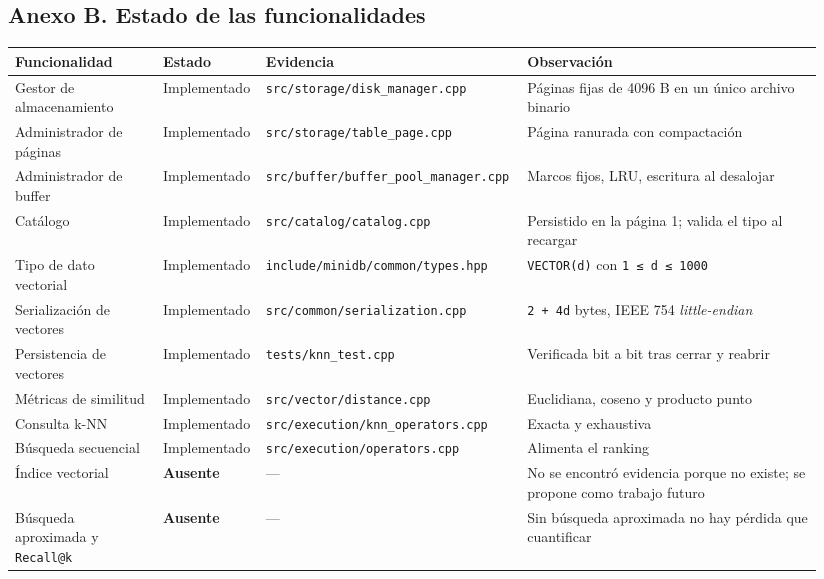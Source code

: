 \documentclass[11pt,a4paper]{article}
\let\subsection\section
\begin{document}
\begin{landscape}
\subsection{Anexo B. Estado de las
funcionalidades}\label{anexo-b-estado-de-las-funcionalidades}

\begin{longtable}[]{@{}L{0.18\linewidth}L{0.12\linewidth}L{0.28\linewidth}L{0.36\linewidth}@{}}
\toprule\noalign{}
Funcionalidad & Estado & Evidencia & Observación \\
\midrule\noalign{}
\endhead
\bottomrule\noalign{}
\endlastfoot
Gestor de almacenamiento & Implementado &
\texttt{src/storage/disk\_manager.cpp} & Páginas fijas de 4096 B en un
único archivo binario \\
Administrador de páginas & Implementado &
\texttt{src/storage/table\_page.cpp} & Página ranurada con
compactación \\
Administrador de buffer & Implementado &
\texttt{src/buffer/buffer\_pool\_manager.cpp} & Marcos fijos, LRU,
escritura al desalojar \\
Catálogo & Implementado & \texttt{src/catalog/catalog.cpp} & Persistido
en la página 1; valida el tipo al recargar \\
Tipo de dato vectorial & Implementado &
\texttt{include/minidb/common/types.hpp} & \texttt{VECTOR(d)} con
\texttt{1\ ≤\ d\ ≤\ 1000} \\
Serialización de vectores & Implementado &
\texttt{src/common/serialization.cpp} & \texttt{2\ +\ 4d} bytes, IEEE
754 \emph{little-endian} \\
Persistencia de vectores & Implementado & \texttt{tests/knn\_test.cpp} &
Verificada bit a bit tras cerrar y reabrir \\
Métricas de similitud & Implementado & \texttt{src/vector/distance.cpp}
& Euclidiana, coseno y producto punto \\
Consulta k-NN & Implementado & \texttt{src/execution/knn\_operators.cpp}
& Exacta y exhaustiva \\
Búsqueda secuencial & Implementado &
\texttt{src/execution/operators.cpp} & Alimenta el ranking \\
Índice vectorial & \textbf{Ausente} & --- & No se encontró evidencia
porque no existe; se propone como trabajo futuro \\
Búsqueda aproximada y \texttt{Recall@k} & \textbf{Ausente} & --- & Sin
búsqueda aproximada no hay pérdida que cuantificar \\

\end{longtable}
\end{landscape}
\end{document}
